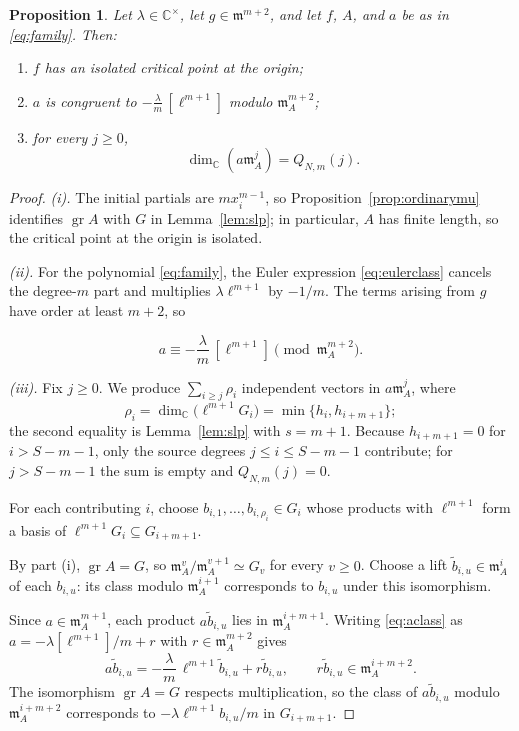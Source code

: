 \documentclass[12pt,reqno]{amsart}
\newcommand{\C}{\mathbb C}
\newcommand{\mm}{\mathfrak m}
\newcommand{\gr}{\operatorname{gr}}
\newtheorem{proposition}[theorem]{Proposition}
\theoremstyle{definition}
\begin{document}
\begin{proposition}\label{prop:attainment}
Let $\lambda\in\C^\times$, let $g\in\mm^{m+2}$, and let
$f$, $A$, and $a$ be as in \eqref{eq:family}.
Then:
\begin{enumerate}
\item $f$ has an isolated critical point at the origin;
\item $a$ is congruent to $-\frac{\lambda}{m}\,[\ell^{m+1}]$ modulo $\mm_A^{m+2}$; 
\item for every $j\geq0$,
\begin{equation}\label{eq:attainedrank}
 \dim_\C(a\mm_A^j)=Q_{N,m}(j).
\end{equation}
\end{enumerate}
\end{proposition}
\begin{proof}
\emph{(i).}
The initial partials are $mx_i^{m-1}$, so
Proposition~\ref{prop:ordinarymu} identifies $\gr A$ with $G$
in Lemma~\ref{lem:slp}; in particular, $A$ has finite length,
so the critical point at the origin is isolated.

\emph{(ii).}
For the polynomial \eqref{eq:family}, the Euler expression
\eqref{eq:eulerclass} cancels the degree-$m$ part and multiplies
$\lambda\ell^{m+1}$ by $-1/m$. The terms arising from $g$ have
order at least $m+2$, so

\begin{equation}\label{eq:aclass}
 a\equiv-\frac{\lambda}{m}\,[\ell^{m+1}]
             \pmod{\mm_A^{m+2}}.
\end{equation}

\emph{(iii).}
Fix $j\geq0$. We produce $\sum_{i\geq j}\rho_i$ independent vectors
in $a\mm_A^j$, where
\[
 \rho_i=\dim_\C\bigl(\ell^{m+1}G_i\bigr)=\min\{h_i,h_{i+m+1}\};
\]
the second equality is Lemma~\ref{lem:slp} with $s=m+1$.
Because $h_{i+m+1}=0$ for $i>S-m-1$, only the source degrees
$j\leq i\leq S-m-1$ contribute; for $j>S-m-1$ the sum is empty
and $Q_{N,m}(j)=0$.

For each contributing $i$, choose
$b_{i,1},\ldots,b_{i,\rho_i}\in G_i$ whose products with
$\ell^{m+1}$ form a basis of
$\ell^{m+1}G_i\subseteq G_{i+m+1}$.

By part (i), $\gr A=G$, so
$\mm_A^v/\mm_A^{v+1}\simeq G_v$ for every $v\geq0$.
Choose a lift $\widetilde b_{i,u}\in\mm_A^i$ of each $b_{i,u}$:
its class modulo $\mm_A^{i+1}$ corresponds to $b_{i,u}$ under this
isomorphism.

Since $a\in\mm_A^{m+1}$, each product $a\widetilde b_{i,u}$ lies in
$\mm_A^{i+m+1}$. Writing \eqref{eq:aclass} as
$a=-\lambda[\ell^{m+1}]/m+r$ with $r\in\mm_A^{m+2}$ gives
\[
 a\widetilde b_{i,u}
 =-\frac{\lambda}{m}\,\ell^{m+1}\widetilde b_{i,u}
   +r\widetilde b_{i,u},
 \qquad r\widetilde b_{i,u}\in\mm_A^{i+m+2}.
\]
The isomorphism $\gr A=G$ respects multiplication, so the class of
$a\widetilde b_{i,u}$ modulo $\mm_A^{i+m+2}$ corresponds to
$-\lambda\ell^{m+1}b_{i,u}/m$ in $G_{i+m+1}$.



\end{proof}
\end{document}
